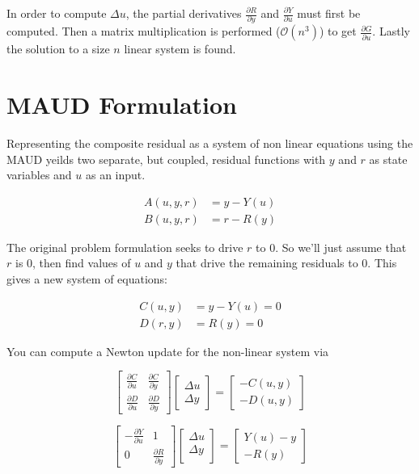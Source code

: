 \documentclass[12pt]{article}
\begin{document}
In order to compute $\Delta u$, the partial derivatives
$\frac{\partial R}{\partial y}$ and  $\frac{\partial Y}{\partial u}$ must first be computed.
Then a matrix multiplication is performed ($\mathcal{O}(n^3)$) to get $\frac{\partial G}{\partial u}$.
Lastly the solution to a size $n$ linear system is found.

\section{MAUD Formulation}

Representing the composite residual as a system of non linear equations using the MAUD yeilds
two separate, but coupled, residual functions with $y$ and $r$ as state variables
and $u$ as an input.

\begin{align}
  A(u,y,r) & = y - Y(u) \label{MAUD_y} \\
  B(u,y,r) & = r - R(y) \label{MAUD_r}
  \label{maud1}
\end{align}

The original problem formulation seeks to drive $r$ to 0. So we'll just assume
that $r$ is 0, then find values of $u$ and $y$ that drive
the remaining residuals to 0. This gives a new system of equations:

\begin{align}
  C(u,y) & = y - Y(u) = 0 \label{y_resid} \\
  D(r,y) & = R(y) = 0 \label{r_resid}
  \label{maud2}
\end{align}

You can compute a Newton update for the non-linear system via

\begin{equation}
  \begin{bmatrix}
    \frac{\partial C}{\partial u} & \frac{\partial C}{\partial y} \\
    \frac{\partial D}{\partial u} & \frac{\partial D}{\partial y}
  \end{bmatrix}
  \begin{bmatrix}
    \Delta u \\
    \Delta y
  \end{bmatrix}
  =
  \begin{bmatrix}
    -C(u,y) \\
    -D(u,y)
  \end{bmatrix}
\end{equation}

\begin{equation}
  \begin{bmatrix}
    -\frac{\partial Y}{\partial u} & 1 \\
    0 & \frac{\partial R}{\partial y}
  \end{bmatrix}
  \begin{bmatrix}
    \Delta u \\
    \Delta y \\
  \end{bmatrix}
  =
  \begin{bmatrix}
    Y(u) - y \\
    - R(y)
  \end{bmatrix}
\end{equation}
\end{document}
